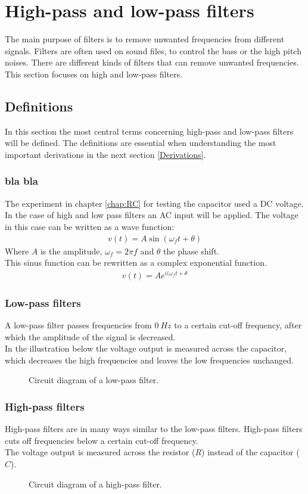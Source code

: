 \chapter{High-pass and low-pass filters}
The main purpose of filters is to remove unwanted frequencies from different signals. Filters are often used on sound files, to control the bass or the high pitch noises. There are different kinds of filters that can remove unwanted frequencies. This section focuses on high and low-pass filters.
\section{Definitions}
In this section the most central terms concerning high-pass and low-pass filters will be defined. The definitions are essential when understanding the most important derivations in the next section \ref{Derivations}.
\subsection{bla bla}
The experiment in chapter \ref{chap:RC} for testing the capacitor used a DC voltage. In the case of high and low pass filters an AC input will be applied. The voltage in this case can be written as a wave function:
\begin{align}
 v(t)=A\sin(\omega_f t+\theta)
 \end{align} 
Where $A$ is the amplitude, $\omega_f=2\pi f$ and $\theta$ the phase shift. 
\\
This sinus function can be rewritten as a complex exponential function.
\begin{align*}
v(t)=Ae^{i(\omega_f t+\theta}
\end{align*}
\subsection{Low-pass filters}
A low-pass filter passes frequencies from  $0~Hz$ to a certain cut-off frequency, after which the amplitude of the signal is decreased.  
\\
In the illustration below the voltage output is measured across the capacitor, which decreases the high frequencies and leaves the low frequencies unchanged.
\\
\begin{figure}[H]
	
	\caption{Circuit diagram of a low-pass filter.} \label{lp:diagram}
\end{figure} 
\subsection{High-pass filters}
High-pass filters are in many ways similar to the low-pass filters. High-pass filters cuts off frequencies below a certain cut-off frequency. \\
The voltage output is measured across the resistor ($R$) instead of the capacitor ($C$). 
\begin{figure}[H]
	
	\caption{Circuit diagram of a high-pass filter.}
	\label{hp:diagram}
\end{figure} 

